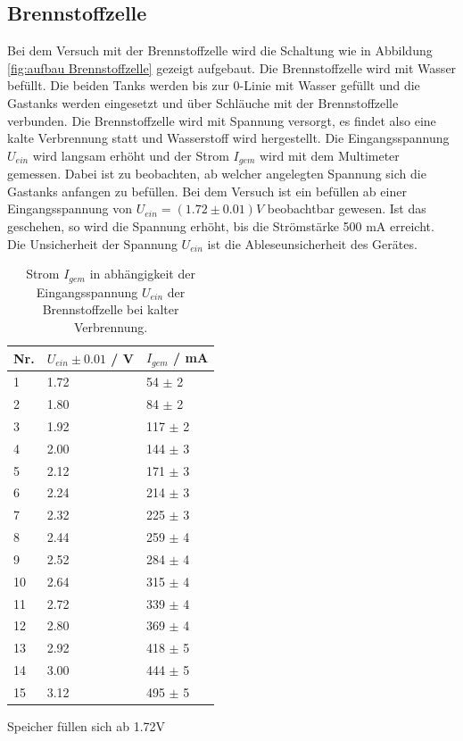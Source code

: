 \documentclass[12pt,a4paper,twoside]{article}
\begin{document}
\subsection{Brennstoffzelle}
Bei dem Versuch mit der Brennstoffzelle wird die Schaltung wie in Abbildung \ref{fig:aufbau Brennstoffzelle} gezeigt aufgebaut. 
Die Brennstoffzelle wird mit Wasser befüllt. Die beiden Tanks werden bis zur 0-Linie mit Wasser gefüllt und die Gastanks werden eingesetzt und über Schläuche mit der Brennstoffzelle verbunden. 
Die Brennstoffzelle wird mit Spannung versorgt, es findet also eine kalte Verbrennung statt und Wasserstoff wird hergestellt. 
Die Eingangsspannung $U_{ein}$ wird langsam erhöht und der Strom $I_{gem}$ wird mit dem Multimeter gemessen. 
Dabei ist zu beobachten, ab welcher angelegten Spannung sich die Gastanks anfangen zu befüllen. Bei dem Versuch ist ein befüllen ab einer Eingangsspannung von $U_{ein} = (1.72 \pm 0.01) V$ beobachtbar gewesen. 
Ist das geschehen, so wird die Spannung erhöht, bis die Strömstärke 500 mA erreicht. 
\\
Die Unsicherheit der Spannung $U_{ein}$ ist die Ableseunsicherheit des Gerätes. 
\begin{table}[H]
    \centering
    \caption{Strom $I_{gem}$ in abhängigkeit der Eingangsspannung $U_{ein}$ der Brennstoffzelle bei kalter Verbrennung. }
    \label{tab:Messdaten Brennstoffzelle}
    \begin{tabular}{| l | l | l |}
        \hline
        Nr. & $U_{ein} \pm 0.01 $  / V & $I_{gem}$ / mA  \\
        \hline
        1  & 1.72  & 54  $\pm$ 2  \\
        2  & 1.80  & 84  $\pm$ 2  \\
        3  & 1.92  & 117 $\pm$ 2  \\
        4  & 2.00  & 144 $\pm$ 3  \\
        5  & 2.12  & 171 $\pm$ 3  \\
        6  & 2.24  & 214 $\pm$ 3  \\
        7  & 2.32  & 225 $\pm$ 3  \\
        8  & 2.44  & 259 $\pm$ 4  \\
        9  & 2.52  & 284 $\pm$ 4  \\
        10 & 2.64  & 315 $\pm$ 4  \\
        11 & 2.72  & 339 $\pm$ 4  \\
        12 & 2.80  & 369 $\pm$ 4  \\
        13 & 2.92  & 418 $\pm$ 5  \\
        14 & 3.00  & 444 $\pm$ 5  \\
        15 & 3.12  & 495 $\pm$ 5  \\
        \hline  
    \end{tabular}
\end{table}
Speicher füllen sich ab 1.72V
\end{document}
